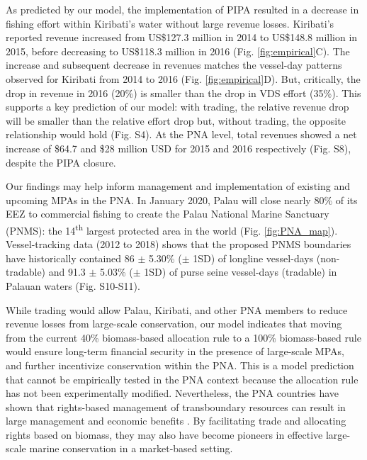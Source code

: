 \documentclass[12pt]{article}
\begin{document}
As predicted by our model, the implementation of PIPA resulted in a decrease in fishing effort within Kiribati's water without large revenue losses. Kiribati's reported revenue increased from US\$127.3 million in 2014 to US\$148.8 million in 2015, before decreasing to US\$118.3 million in 2016 (Fig. \ref{fig:empirical}C). The increase and subsequent decrease in revenues matches the vessel-day patterns observed for Kiribati from 2014 to 2016 (Fig. \ref{fig:empirical}D). But, critically, the drop in revenue in 2016 (20\%) is smaller than the drop in VDS effort (35\%). This supports a key prediction of our model: with trading, the relative revenue drop will be smaller than the relative effort drop but, without trading, the opposite relationship would hold (Fig. S4). At the PNA level, total revenues showed a net increase of \$64.7 and \$28 million USD for 2015 and 2016 respectively (Fig. S8), despite the PIPA closure.

Our findings may help inform management and implementation of existing and upcoming MPAs in the PNA. In January 2020, Palau will close nearly 80\% of its EEZ to commercial fishing to create the Palau National Marine Sanctuary (PNMS): the 14\textsuperscript{th} largest protected area in the world (Fig. \ref{fig:PNA_map}). Vessel-tracking data (2012 to 2018) shows that the proposed PNMS boundaries have historically contained 86 $\pm$ 5.30\% ($\pm$ 1SD) of longline vessel-days (non-tradable) and 91.3 $\pm$ 5.03\% ($\pm$ 1SD) of purse seine vessel-days (tradable) in Palauan waters (Fig. S10-S11).

While trading would allow Palau, Kiribati, and other PNA members to reduce revenue losses from large-scale conservation, our model indicates that moving from the current 40\% biomass-based allocation rule to a 100\% biomass-based rule would ensure long-term financial security in the presence of large-scale MPAs, and further incentivize conservation within the PNA. This is a model prediction that cannot be empirically tested in the PNA context because the allocation rule has not been experimentally modified. Nevertheless, the PNA countries have shown that rights-based management of transboundary resources can result in large management and economic benefits \cite{havice_2013,aqorau_2018}. By facilitating trade and allocating rights based on biomass, they may also have become pioneers in effective large-scale marine conservation in a market-based setting.
\end{document}

